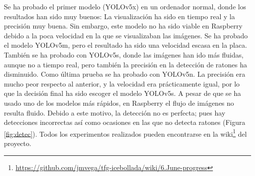 Se ha probado el primer modelo (YOLOv5x) en un ordenador normal, donde los resultados han sido muy buenos: La visualización ha sido en tiempo real y la precisión muy buena. Sin embargo, este modelo no ha sido viable en Raspberry debido a la poca velocidad en la que se visualizaban las imágenes. Se ha probado el modelo YOLOv5m, pero el resultado ha sido una velocidad escasa en la placa. También se ha probado con YOLOv5s, donde las imágenes han ido más fluidas, aunque no a tiempo real, pero también la precisión en la detección de ratones ha disminuido. Como última prueba se ha probado con YOLOv5n. La precisión era mucho peor respecto al anterior, y la velocidad era prácticamente igual, por lo que la decisión final ha sido escoger el modelo YOLOv5s. A pesar de que se ha usado uno de los modelos más rápidos, en Raspberry el flujo de imágenes no resulta fluido. Debido a este motivo, la detección no es perfecta; pues hay detecciones incorrectas así como ocasiones en las que no detecta ratones (Figura \ref{fig:detec}). Todos los experimentos realizados pueden encontrarse en la wiki\footnote{\url{https://github.com/jmvega/tfg-icebollada/wiki/6.June-progress}} del proyecto.\\
